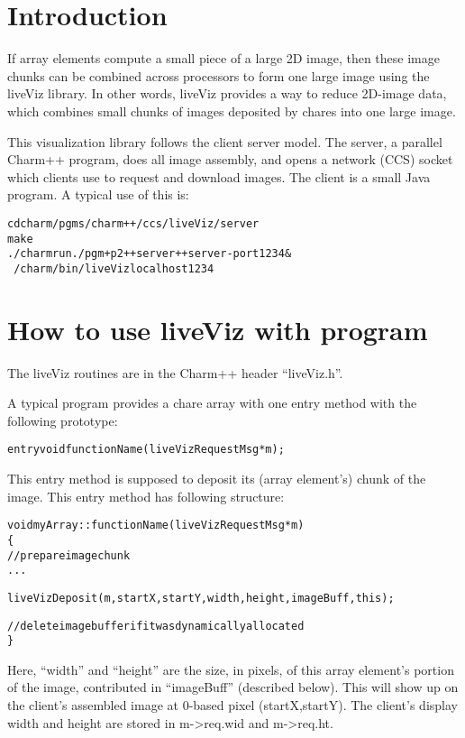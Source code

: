\section{Introduction}

If array elements compute a small piece of a large 2D image, then these 
image chunks can be combined across processors to form one large 
image using the liveViz library. In other 
words, liveViz provides a way to reduce 2D-image data, which 
combines small chunks
 of images deposited by chares into one large image.

This visualization library follows the client server model.
The server, a parallel Charm++ program, does all image assembly, 
and opens a network (CCS) socket which clients use to request and 
download images.  The client is a small Java program.
A typical use of this is:
\begin{alltt}
	cd charm/pgms/charm++/ccs/liveViz/server
	make
	./charmrun ./pgm +p2 ++server ++server-port 1234 &
	~/charm/bin/liveViz localhost 1234
\end{alltt}



\section{How to use liveViz with \charmpp{} program}

The liveViz routines are in the Charm++ header ``liveViz.h''.

A typical program provides a chare array with one entry method 
with the following prototype:

\begin{alltt}
  entry void functionName(liveVizRequestMsg *m);
\end{alltt}

This entry method is supposed to deposit its (array element's) chunk of 
the image. This entry method has following structure:

\begin{alltt}
  void myArray::functionName (liveVizRequestMsg *m)
  \{
    // prepare image chunk
       ...

    liveVizDeposit (m, startX, startY, width, height, imageBuff, this);

    // delete image buffer if it was dynamically allocated
  \}
\end{alltt}

Here, ``width'' and ``height'' are the size, in pixels, of this array
element's portion of the image, contributed in ``imageBuff'' (described below).
This will show up on the client's assembled image at 0-based pixel
(startX,startY).  The client's display width and height are stored
in m->req.wid and m->req.ht.

